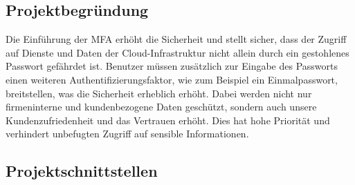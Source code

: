\subsection{Projektbegründung} 
\label{sec:Projektbegruendung}
Die Einführung der MFA erhöht die Sicherheit und stellt sicher, dass der Zugriff 
auf Dienste und Daten der Cloud-Infrastruktur nicht allein durch ein gestohlenes
Passwort gefährdet ist.
Benutzer müssen zusätzlich zur Eingabe des Passworts einen weiteren Authentifizierungsfaktor, 
wie zum Beispiel ein Einmalpasswort, breitstellen, was die Sicherheit erheblich erhöht. 
Dabei werden nicht nur firmeninterne und kundenbezogene Daten geschützt, sondern auch 
unsere Kundenzufriedenheit und das Vertrauen erhöht. Dies hat hohe Priorität und 
verhindert unbefugten Zugriff auf sensible Informationen.


\subsection{Projektschnittstellen} 
\label{sec:Projektschnittstellen}

